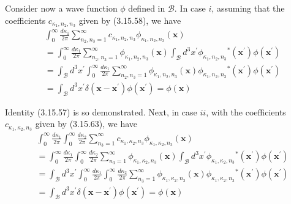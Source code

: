 \documentclass{article}
\begin{document}
Consider now a wave function $\phi$ defined in $\mathcal{B}$. In case $i$, assuming that the coefficients $c_{\kappa_{1}, n_{2}, n_{3}}$ given by (3.15.58), we have
$$
\begin{align*}
& \int_{0}^{\infty} \frac{d \kappa_{1}}{2 \pi} \sum_{n_{2}, n_{3}=1}^{\infty} c_{\kappa_{1}, n_{2}, n_{3}} \phi_{\kappa_{1}, n_{2}, n_{3}}(\boldsymbol{x})  \tag{3.15.83}\\
& =\int_{0}^{\infty} \frac{d \kappa_{1}}{2 \pi} \sum_{n_{2}, n_{3}=1}^{\infty} \phi_{\kappa_{1}, n_{2}, n_{3}}(\boldsymbol{x}) \int_{\mathcal{B}} d^{3} x^{\prime} \phi_{\kappa_{1}, n_{2}, n_{3}}{ }^{*}\left(\boldsymbol{x}^{\prime}\right) \phi\left(\boldsymbol{x}^{\prime}\right) \\
& =\int_{\mathcal{B}} d^{3} x^{\prime} \int_{0}^{\infty} \frac{d \kappa_{1}}{2 \pi} \sum_{n_{2}, n_{3}=1}^{\infty} \phi_{\kappa_{1}, n_{2}, n_{3}}(\boldsymbol{x}) \phi_{\kappa_{1}, n_{2}, n_{3}}{ }^{*}\left(\boldsymbol{x}^{\prime}\right) \phi\left(\boldsymbol{x}^{\prime}\right) \\
& =\int_{\mathcal{B}} d^{3} x^{\prime} \delta\left(\boldsymbol{x}-\boldsymbol{x}^{\prime}\right) \phi\left(\boldsymbol{x}^{\prime}\right)=\phi(\boldsymbol{x})
\end{align*}
$$

Identity (3.15.57) is so demonstrated. Next, in case $i i$, with the coefficients $c_{\kappa_{1}, \kappa_{2}, n_{3}}$
given by (3.15.63), we have
$$
\begin{align*}
& \int_{0}^{\infty} \frac{d \kappa_{1}}{2 \pi} \int_{0}^{\infty} \frac{d \kappa_{2}}{2 \pi} \sum_{n_{3}=1}^{\infty} c_{\kappa_{1}, \kappa_{2}, n_{3}} \phi_{\kappa_{1}, \kappa_{2}, n_{3}}(\boldsymbol{x})  \tag{3.15.84}\\
& =\int_{0}^{\infty} \frac{d \kappa_{1}}{2 \pi} \int_{0}^{\infty} \frac{d \kappa_{2}}{2 \pi} \sum_{n_{3}=1}^{\infty} \phi_{\kappa_{1}, \kappa_{2}, n_{3}}(\boldsymbol{x}) \int_{\mathcal{B}} d^{3} x^{\prime} \phi_{\kappa_{1}, \kappa_{2}, n_{3}}{ }^{*}\left(\boldsymbol{x}^{\prime}\right) \phi\left(\boldsymbol{x}^{\prime}\right) \\
& =\int_{\mathcal{B}} d^{3} x^{\prime} \int_{0}^{\infty} \frac{d \kappa_{1}}{2 \pi} \int_{0}^{\infty} \frac{d \kappa_{2}}{2 \pi} \sum_{n_{3}=1}^{\infty} \phi_{\kappa_{1}, \kappa_{2}, n_{3}}(\boldsymbol{x}) \phi_{\kappa_{1}, \kappa_{2}, n_{3}}{ }^{*}\left(\boldsymbol{x}^{\prime}\right) \phi\left(\boldsymbol{x}^{\prime}\right) \\
& =\int_{\mathcal{B}} d^{3} x^{\prime} \delta\left(\boldsymbol{x}-\boldsymbol{x}^{\prime}\right) \phi\left(\boldsymbol{x}^{\prime}\right)=\phi(\boldsymbol{x})
\end{align*}
$$
\end{document}
